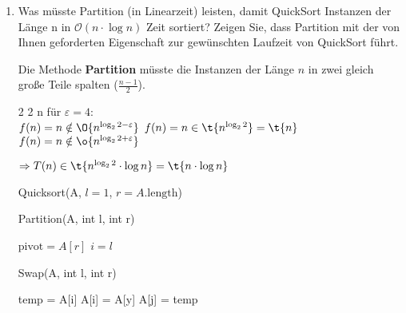 \documentclass{bschlangaul-aufgabe}
\begin{document}
\begin{enumerate}

\item Was müsste Partition (in Linearzeit) leisten, damit QuickSort
Instanzen der Länge n in $\mathcal{O}(n \cdot \log n)$ Zeit sortiert?
Zeigen Sie, dass Partition mit der von Ihnen geforderten Eigenschaft zur
gewünschten Laufzeit von QuickSort führt.

\bMasterExkurs

\begin{bAntwort}
Die Methode \textbf{Partition} müsste die Instanzen der Länge $n$ in
zwei gleich große Teile spalten ($\frac{n - 1}{2}$).

\bMasterVariablenDeklaration
{2} %
{2} %
{n} %
\bMasterFallRechnung
{für $\varepsilon = 4$: \\
$f(n) = n \notin \O{n^{\log_2 {2 - \varepsilon}}}$}
{$f(n) = n \in \t{n^{\log_2 {2}}} = \t{n}$}
{$f(n) = n \notin \o{n^{\log_2 {2 + \varepsilon}}}$}

$\Rightarrow T(n) \in \t{n^{\log_2 {2}} \cdot \log n} = \t{n \cdot \log n}$

\end{bAntwort}

\begin{function}
\caption{Quicksort(A, $l = 1$, $r = A.\text{length}$)}

\end{function}

\begin{function}
\caption{Partition(A, int l, int r)}
$\text{pivot} = A[r]$\;
$i = l$\;
\end{function}

\begin{function}
\caption{Swap(A, int l, int r)}
temp = A[i]\;
A[i] = A[y]\;
A[j] = temp\;
\end{function}

\end{enumerate}
\end{document}
